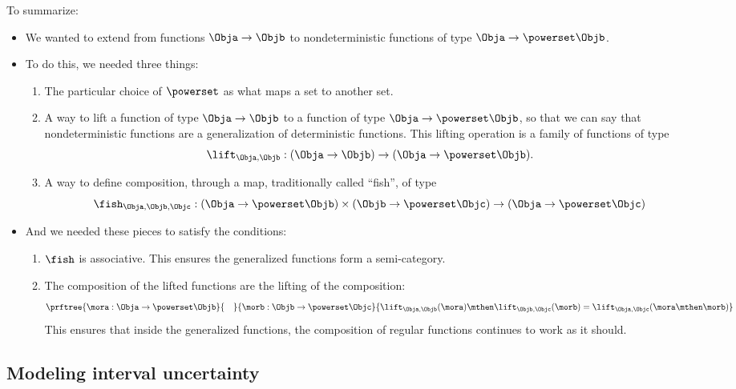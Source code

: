 To summarize: 
\begin{itemize}
    \item We wanted to extend \Set from functions $\Obja \to \Objb$ to nondeterministic functions of type $\Obja \to \powerset\Objb$.
    \item To do this, we needed three things:
    \begin{enumerate}
        \item The particular choice of $\powerset$ as what maps a set to another set. 
    \item A way to lift a function of type $\Obja \to \Objb$ to a function of type $\Obja \to \powerset\Objb$, so that we can say that nondeterministic functions are a generalization of deterministic functions. This lifting operation is a family of functions of type 
    \begin{equation}
        \lift_{\Obja, \Objb}: (\Obja \to \Objb) \to (\Obja \to \powerset\Objb).
    \end{equation}
    \item A way to define composition, through a map, traditionally called ``fish'', of type
    \begin{equation}
        \fish_{\Obja, \Objb, \Objc}: (\Obja \to \powerset\Objb) \times (\Objb \to \powerset\Objc) 
        \to (\Obja \to \powerset \Objc)
    \end{equation}
\end{enumerate}
\item And we needed these pieces to satisfy the conditions:
\begin{enumerate}
    \item $\fish$ is associative. This ensures the generalized functions form a semi-category.
    \item The composition of the lifted functions are the lifting of the composition:
    \begin{equation} 
        \prftree{\mora: \Obja \to \powerset\Objb}{\quad}{\morb: \Objb \to \powerset \Objc}{
        \lift_{\Obja,\Objb}(\mora)\mthen\lift_{\Objb,\Objc}(\morb) =  \lift_{\Obja,\Objc}(\mora\mthen\morb)}
    \end{equation}
    This ensures that inside the generalized functions, the composition of regular functions continues to work as it should.
\end{enumerate}
\end{itemize}

\subsection{Modeling interval uncertainty}

